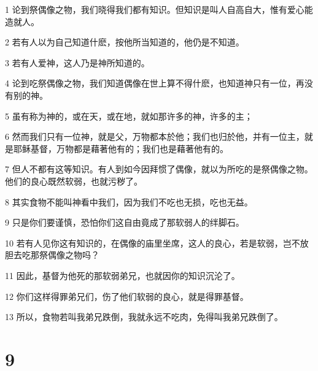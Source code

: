 \par 1 论到祭偶像之物，我们晓得我们都有知识。但知识是叫人自高自大，惟有爱心能造就人。
\par 2 若有人以为自己知道什麽，按他所当知道的，他仍是不知道。
\par 3 若有人爱神，这人乃是神所知道的。
\par 4 论到吃祭偶像之物，我们知道偶像在世上算不得什麽，也知道神只有一位，再没有别的神。
\par 5 虽有称为神的，或在天，或在地，就如那许多的神，许多的主；
\par 6 然而我们只有一位神，就是父，万物都本於他；我们也归於他，并有一位主，就是耶稣基督，万物都是藉著他有的；我们也是藉著他有的。
\par 7 但人不都有这等知识。有人到如今因拜惯了偶像，就以为所吃的是祭偶像之物。他们的良心既然软弱，也就污秽了。
\par 8 其实食物不能叫神看中我们，因为我们不吃也无损，吃也无益。
\par 9 只是你们要谨慎，恐怕你们这自由竟成了那软弱人的绊脚石。
\par 10 若有人见你这有知识的，在偶像的庙里坐席，这人的良心，若是软弱，岂不放胆去吃那祭偶像之物吗？
\par 11 因此，基督为他死的那软弱弟兄，也就因你的知识沉沦了。
\par 12 你们这样得罪弟兄们，伤了他们软弱的良心，就是得罪基督。
\par 13 所以，食物若叫我弟兄跌倒，我就永远不吃肉，免得叫我弟兄跌倒了。

\chapter{9}

